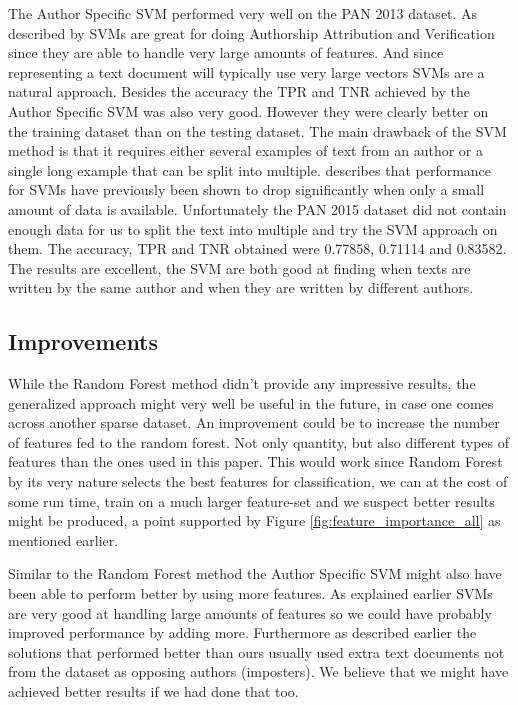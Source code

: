The Author Specific SVM performed very well on the PAN 2013 dataset. As
described by \cite{stamatos2009} \gls{SVM}s are great for doing Authorship
Attribution and Verification since they are able to handle very large amounts of
features. And since representing a text document will typically use very large
vectors \gls{SVM}s are a natural approach. Besides the accuracy the \gls{TPR}
and \gls{TNR} achieved by the Author Specific SVM was also very good. However
they were clearly better on the training dataset than on the testing dataset.
The main drawback of the SVM method is that it requires either several examples
of text from an author or a single long example that can be split into multiple.
\cite{stamatos2009} describes that performance for \gls{SVM}s have previously
been shown to drop significantly when only a small amount of data is available.
Unfortunately the PAN 2015 dataset did not contain enough data for us to split
the text into multiple and try the SVM approach on them. The accuracy, \gls{TPR}
and \gls{TNR} obtained were 0.77858, 0.71114 and 0.83582. The results are
excellent, the \gls{SVM} are both good at finding when texts are written by the
same author and when they are written by different authors.

\subsection{Improvements}

While the Random Forest method didn't provide any impressive results, the
generalized approach might very well be useful in the future, in case one comes
across another sparse dataset. An improvement could be to increase the number
of features fed to the random forest. Not only quantity, but also different
types of features than the ones used in this paper. This would work since
Random Forest by its very nature selects the best features for classification,
we can at the cost of some run time, train on a much larger feature-set and
we suspect better results might be produced, a point supported by Figure
\ref{fig:feature_importance_all} as mentioned earlier.

Similar to the Random Forest method the Author Specific SVM might also have been
able to perform better by using more features. As explained earlier \gls{SVM}s
are very good at handling large amounts of features so we could have probably
improved performance by adding more. Furthermore as described earlier the
solutions that performed better than ours usually used extra text documents not
from the dataset as opposing authors (imposters). We believe that we might have
achieved better results if we had done that too.
